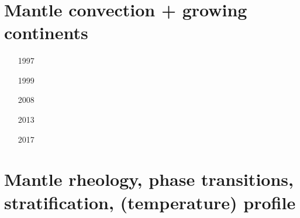 \begin{small}
\begin{itemize}
\item[\twothousandtwentytwo] 
 \\ 
 \\ 
\item[\twothousandtwentythree] 
 \\ 
\item[\twothousandtwentyfour] 
 \\ 
 \\ 
\end{itemize}
\end{small}

\section{Mantle convection + growing continents}

\begin{small}
\begin{itemize}
\item[1997]
\item[1999]
\item[2008]
\item[2013]
\item[2017]
\end{itemize}
\end{small}

\section{Mantle rheology, phase transitions, stratification, (temperature) profile}

